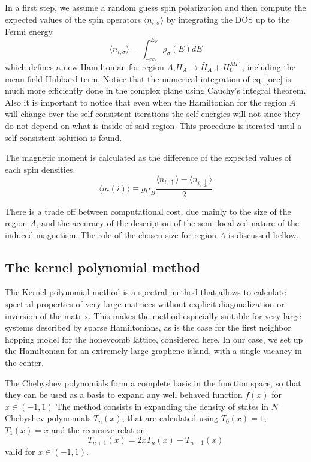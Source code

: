In a first step, we assume a random guess spin polarization and then compute the expected values of the spin operators $\langle n_{i,\sigma} \rangle$ by integrating the DOS up to the Fermi energy
\begin{equation}
 \langle n_{i,\sigma}\rangle= \int_{-\infty}^{E_F} \rho_{\sigma}(E) dE
 \label{occ}
\end{equation}
which defines a new Hamiltonian for region $A$,$H_A \rightarrow \bar H_A + H^{MF}_U$%
, including the mean field Hubbard term.\cite{Fernandez2007,Palacios2008} Notice that the numerical integration of eq. \eqref{occ} is much more efficiently done in the complex plane using Cauchy's integral theorem. Also it is important to notice that even when the Hamiltonian for the region $A$ will change over the self-consistent iterations the self-energies will not since they do not depend on what is inside of said region.
This procedure is iterated until a self-consistent solution is found.

The magnetic moment is calculated as the difference of the expected values of each spin densities.
\begin{equation}
\langle m(i)\rangle \equiv g\mu_B\frac{\langle n_{i,\uparrow}\rangle-\langle n_{i,\downarrow}\rangle}{2}
\label{sz}
\end{equation}

There is a trade off between computational cost, due mainly to the size of the region $A$, and the accuracy of the description of the semi-localized nature of the induced magnetism. The role of the chosen size for region $A$ is discussed bellow.


\subsection{The kernel polynomial method}
The Kernel polynomial method\cite{Weisse2006} is a spectral method that allows to calculate spectral properties of very large matrices without explicit diagonalization or inversion of the matrix.
This makes the method especially suitable for very large systems described by sparse Hamiltonians, as is the case for the first neighbor hopping model for the honeycomb lattice, considered here.
In our case, we set up the Hamiltonian for an extremely large graphene island, with a single vacancy in the center.

{The Chebyshev polynomials form a complete basis in the function space, so that they can be used as a basis to expand any well behaved function} $f(x)$ for $x\in (-1, 1)$
The method consists in expanding the density of states in $N$ Chebyshev polynomials $T_n(x)$,  that are calculated using $T_0(x)=1$, $T_1(x)=x$ and the recursive relation
\begin{equation}
T_{n+1} (x) = 2 x T_n(x) - T_{n-1} (x)
\end{equation}
valid for $x\in (-1,1)$.

